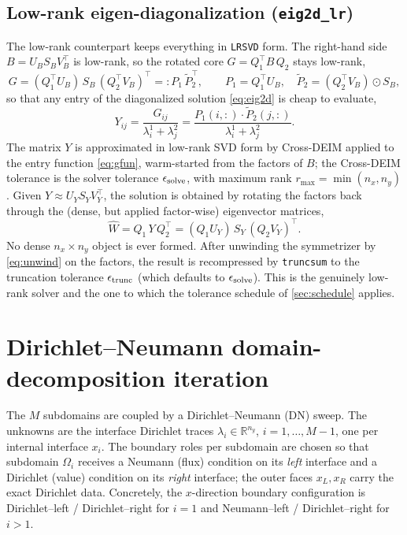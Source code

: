 \documentclass[hidelinks,onefignum,onetabnum]{siamart250211}
\newcommand{\R}{\mathbb{R}}
\newcommand{\What}{\widehat{W}}
\begin{document}
\subsection{Low-rank eigen-diagonalization ({\tt eig2d\_lr})}
\label{sec:eig2dlr}
The low-rank counterpart keeps everything in {\tt LRSVD} form.  The right-hand
side $B = U_B S_B V_B^{\!\top}$ is low-rank, so the rotated core
$G = Q_1^{\!\top} B\, Q_2$ stays low-rank,
\begin{equation}
\label{eq:core}
G = (Q_1^{\!\top}U_B)\, S_B\, (Q_2^{\!\top}V_B)^{\!\top}
  =: P_1\,\widetilde{P}_2^{\!\top},
\qquad
P_1 = Q_1^{\!\top}U_B, \quad
\widetilde{P}_2 = (Q_2^{\!\top}V_B)\odot S_B,
\end{equation}
so that any entry of the diagonalized solution \cref{eq:eig2d} is cheap to
evaluate,
\begin{equation}
\label{eq:gfun}
Y_{ij} = \frac{G_{ij}}{\lambda^1_i + \lambda^2_j}
       = \frac{P_1(i,:)\cdot\widetilde{P}_2(j,:)}{\lambda^1_i + \lambda^2_j}.
\end{equation}
The matrix $Y$ is approximated in low-rank SVD form by Cross-DEIM applied to the
entry function \cref{eq:gfun}, warm-started from the factors of $B$; the
Cross-DEIM tolerance is the solver tolerance $\epsilon_{\rm solve}$, with maximum
rank $r_{\max}=\min(n_x,n_y)$.  Given $Y\approx U_Y S_Y V_Y^{\!\top}$, the
solution is obtained by rotating the factors back through the (dense, but
applied factor-wise) eigenvector matrices,
\begin{equation}
\label{eq:eig2dlr}
\What = Q_1\, Y\, Q_2^{\!\top}
      = (Q_1 U_Y)\, S_Y\, (Q_2 V_Y)^{\!\top}.
\end{equation}
No dense $n_x\times n_y$ object is ever formed.  After unwinding the symmetrizer
by \cref{eq:unwind} on the factors, the result is recompressed by {\tt truncsum}
to the truncation tolerance $\epsilon_{\rm trunc}$ (which defaults to
$\epsilon_{\rm solve}$).  This is the genuinely low-rank solver and the one to
which the tolerance schedule of \cref{sec:schedule} applies.

\section{Dirichlet--Neumann domain-decomposition iteration}
\label{sec:dn}
The $M$ subdomains are coupled by a Dirichlet--Neumann (DN) sweep.  The unknowns
are the interface Dirichlet traces $\lambda_i \in \R^{n_y}$,
$i=1,\dots,M-1$, one per internal interface $x_i$.  The boundary roles per
subdomain are chosen so that subdomain $\Omega_i$ receives a Neumann (flux)
condition on its \emph{left} interface and a Dirichlet (value) condition on its
\emph{right} interface; the outer faces $x_L, x_R$ carry the exact Dirichlet
data.  Concretely, the $x$-direction boundary configuration is Dirichlet--left /
Dirichlet--right for $i=1$ and Neumann--left / Dirichlet--right for $i>1$.
\end{document}
